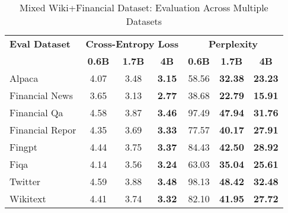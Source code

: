 
\begin{table}[h]
\centering
\caption[Mixed Wiki+Financial: Evaluation Results]{Mixed Wiki+Financial Dataset: Evaluation Across Multiple Datasets}
\label{tab:mixed_wiki_financial_results}
\begin{tabular}{l|ccc|ccc}
\hline
\textbf{Eval Dataset} & \multicolumn{3}{c|}{\textbf{Cross-Entropy Loss}} & \multicolumn{3}{c}{\textbf{Perplexity}} \\
\cline{2-4} \cline{5-7}
  & \textbf{0.6B} & \textbf{1.7B} & \textbf{4B} & \textbf{0.6B} & \textbf{1.7B} & \textbf{4B} \\
Alpaca & 4.07 & 3.48 & \textbf{3.15} & 58.56 & \textbf{32.38} & \textbf{23.23} \\
Financial News & 3.65 & 3.13 & \textbf{2.77} & 38.68 & \textbf{22.79} & \textbf{15.91} \\
Financial Qa & 4.58 & 3.87 & \textbf{3.46} & 97.49 & \textbf{47.94} & \textbf{31.76} \\
Financial Repor & 4.35 & 3.69 & \textbf{3.33} & 77.57 & \textbf{40.17} & \textbf{27.91} \\
Fingpt & 4.44 & 3.75 & \textbf{3.37} & 84.43 & \textbf{42.50} & \textbf{28.92} \\
Fiqa & 4.14 & 3.56 & \textbf{3.24} & 63.03 & \textbf{35.04} & \textbf{25.61} \\
Twitter & 4.59 & 3.88 & \textbf{3.48} & 98.13 & \textbf{48.42} & \textbf{32.48} \\
Wikitext & 4.41 & 3.74 & \textbf{3.32} & 82.10 & \textbf{41.95} & \textbf{27.72} \\
\hline
\end{tabular}
\end{table}

